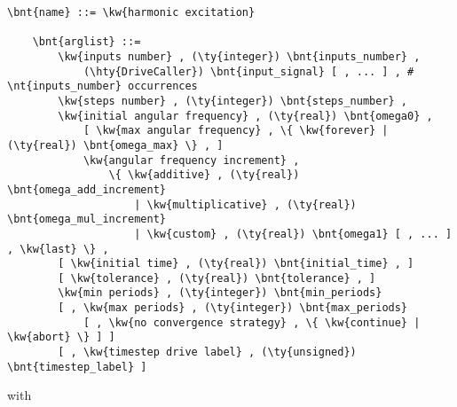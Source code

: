 \begin{Verbatim}[commandchars=\\\{\}]
    \bnt{name} ::= \kw{harmonic excitation}

    \bnt{arglist} ::=
        \kw{inputs number} , (\ty{integer}) \bnt{inputs_number} ,
            (\hty{DriveCaller}) \bnt{input_signal} [ , ... ] , # \nt{inputs_number} occurrences
        \kw{steps number} , (\ty{integer}) \bnt{steps_number} ,
        \kw{initial angular frequency} , (\ty{real}) \bnt{omega0} ,
            [ \kw{max angular frequency} , \{ \kw{forever} | (\ty{real}) \bnt{omega_max} \} , ]
            \kw{angular frequency increment} ,
                \{ \kw{additive} , (\ty{real}) \bnt{omega_add_increment}
                    | \kw{multiplicative} , (\ty{real}) \bnt{omega_mul_increment}
                    | \kw{custom} , (\ty{real}) \bnt{omega1} [ , ... ] , \kw{last} \} ,
        [ \kw{initial time} , (\ty{real}) \bnt{initial_time} , ]
        [ \kw{tolerance} , (\ty{real}) \bnt{tolerance} , ]
        \kw{min periods} , (\ty{integer}) \bnt{min_periods}
        [ , \kw{max periods} , (\ty{integer}) \bnt{max_periods}
            [ , \kw{no convergence strategy} , \{ \kw{continue} | \kw{abort} \} ] ]
        [ , \kw{timestep drive label} , (\ty{unsigned}) \bnt{timestep_label} ]
\end{Verbatim}
with
